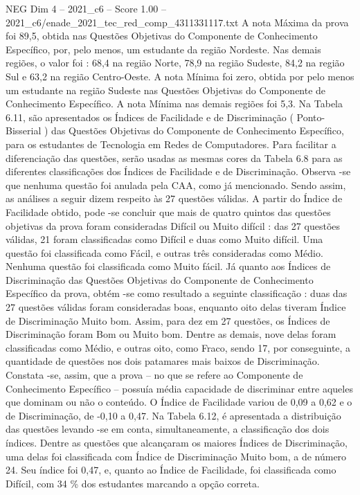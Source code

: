 \begin{textsample}{NEG Dim 4 – 2021\_c6 – Score 1.00 – 2021\_c6/enade\_2021\_tec\_red\_comp\_4311331117.txt}
A nota Máxima da prova foi 89,5, obtida nas Questões Objetivas do Componente de Conhecimento Específico, por, pelo menos, um estudante da região Nordeste.
Nas demais regiões, o valor foi : 68,4 na região Norte, 78,9 na região Sudeste, 84,2 na região Sul e 63,2 na região Centro-Oeste.
A nota Mínima foi zero, obtida por pelo menos um estudante na região Sudeste nas Questões Objetivas do Componente de Conhecimento Específico.
A nota Mínima nas demais regiões foi 5,3.
Na Tabela 6.11, são apresentados os Índices de Facilidade e de Discriminação ( Ponto-Bisserial ) das Questões Objetivas do Componente de Conhecimento Específico, para os estudantes de Tecnologia em Redes de Computadores.
Para facilitar a diferenciação das questões, serão usadas as mesmas cores da Tabela 6.8 para as diferentes classificações dos Índices de Facilidade e de Discriminação.
Observa -se que nenhuma questão foi anulada pela CAA, como já mencionado.
Sendo assim, as análises a seguir dizem respeito às 27 questões válidas.
A partir do Índice de Facilidade obtido, pode -se concluir que mais de quatro quintos das questões objetivas da prova foram consideradas Difícil ou Muito difícil : das 27 questões válidas, 21 foram classificadas como Difícil e duas como Muito difícil.
Uma questão foi classificada como Fácil, e outras três consideradas como Médio.
Nenhuma questão foi classificada como Muito fácil.
Já quanto aos Índices de Discriminação das Questões Objetivas do Componente de Conhecimento Específico da prova, obtém -se como resultado a seguinte classificação : duas das 27 questões válidas foram consideradas boas, enquanto oito delas tiveram Índice de Discriminação Muito bom.
Assim, para dez em 27 questões, os Índices de Discriminação foram Bom ou Muito bom.
Dentre as demais, nove delas foram classificadas como Médio, e outras oito, como Fraco, sendo 17, por conseguinte, a quantidade de questões nos dois patamares mais baixos de Discriminação.
Constata -se, assim, que a prova – no que se refere ao Componente de Conhecimento Específico – possuía média capacidade de discriminar entre aqueles que dominam ou não o conteúdo.
O Índice de Facilidade variou de 0,09 a 0,62 e o de Discriminação, de -0,10 a 0,47.
Na Tabela 6.12, é apresentada a distribuição das questões levando -se em conta, simultaneamente, a classificação dos dois índices.
Dentre as questões que alcançaram os maiores Índices de Discriminação, uma delas foi classificada com Índice de Discriminação Muito bom, a de número 24.
Seu índice foi 0,47, e, quanto ao Índice de Facilidade, foi classificada como Difícil, com 34 \% dos estudantes marcando a opção correta.

\end{textsample}
